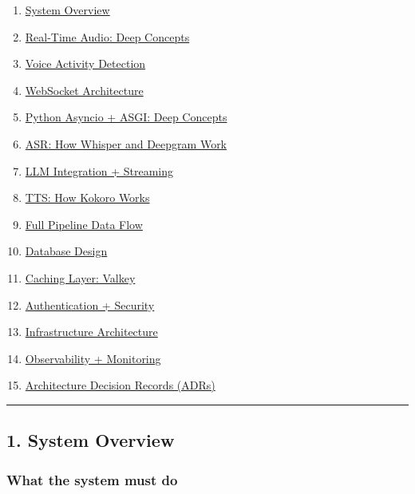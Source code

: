 \documentclass[
  11pt,
]{article}
\providecommand{\tightlist}{%
  \setlength{\itemsep}{0pt}\setlength{\parskip}{0pt}}
\begin{document}
\begin{enumerate}
\def\labelenumi{\arabic{enumi}.}
\tightlist
\item
  \protect\hyperlink{1-system-overview}{System Overview}
\item
  \protect\hyperlink{2-real-time-audio-deep-concepts}{Real-Time Audio:
  Deep Concepts}
\item
  \protect\hyperlink{3-voice-activity-detection}{Voice Activity
  Detection}
\item
  \protect\hyperlink{4-websocket-architecture}{WebSocket Architecture}
\item
  \protect\hyperlink{5-python-asyncio--asgi-deep-concepts}{Python
  Asyncio + ASGI: Deep Concepts}
\item
  \protect\hyperlink{6-asr-how-whisper-and-deepgram-work}{ASR: How
  Whisper and Deepgram Work}
\item
  \protect\hyperlink{7-llm-integration--streaming}{LLM Integration +
  Streaming}
\item
  \protect\hyperlink{8-tts-how-kokoro-works}{TTS: How Kokoro Works}
\item
  \protect\hyperlink{9-full-pipeline-data-flow}{Full Pipeline Data Flow}
\item
  \protect\hyperlink{10-database-design}{Database Design}
\item
  \protect\hyperlink{11-caching-layer-valkey}{Caching Layer: Valkey}
\item
  \protect\hyperlink{12-authentication--security}{Authentication +
  Security}
\item
  \protect\hyperlink{13-infrastructure-architecture}{Infrastructure
  Architecture}
\item
  \protect\hyperlink{14-observability--monitoring}{Observability +
  Monitoring}
\item
  \protect\hyperlink{15-architecture-decision-records-adrs}{Architecture
  Decision Records (ADRs)}
\end{enumerate}

\begin{center}\rule{0.5\linewidth}{0.5pt}\end{center}

\hypertarget{system-overview}{%
\subsection{1. System Overview}\label{system-overview}}

\hypertarget{what-the-system-must-do}{%
\subsubsection{What the system must do}\label{what-the-system-must-do}}
\end{document}
